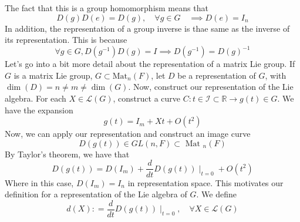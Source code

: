 \documentclass[11pt, oneside]{article}   	%
\theoremstyle{slanted}
\begin{document}
The fact that this is a 
group homomorphism means that 
\[
	D ( g ) D ( e) =  D( g), \quad \forall g \in G  \quad \implies D ( e ) = I_ n 
\] In addition, 
the representation of a group inverse is thae 
same as the inverse of its representation. This is because 
\[
	\forall g \in G, D ( g ^{ -1  } ) D ( g) = I \implies D ( g ^{ -1  } )  = D ( g) ^{ -1 }
\]  
Let's go into a bit more detail about the representation
of a matrix Lie group. If $ G $ is a matrix Lie group, 
$ G \subset \text{Mat} _n ( F )  $, let $ D $ 
be a representation of $ G$, with  $ \dim ( D ) = n \neq m \neq \dim ( G ) $. 
Now, construct our representation of 
the Lie algebra. 
For each  $ X \in \mathcal{ L } ( G ) $, 
construct a curve $ C : t \in \mathcal{ I } \subset \mathbb{ R} \to g ( t) \in G $. 
We have the expansion 
\[
 g ( t) = I_m + Xt + O ( t ^ 2 ) 
\] Now, we can apply our
representation and construct an image curve
\[
	D ( g ( t ) ) \in GL( n, F ) \subset \text{ Mat }_n ( F) 
\] By Taylor's theorem, 
we have that 
\[
	D ( g ( t ) ) = D ( I _ m ) + \frac{d }{ dt } D ( g ( t) ) \mid_{ t = 0 } + O ( t^ 2 ) 
\] Where in this case, $ D ( I _ m )  = I _ n $ in
representation space. This motivates our definition 
for a representation of the Lie algebra of  $ G $.
We define 
\[
	d ( X) : = \frac{d }{ dt  }  D( g ( t ) ) \mid_{ t =0 }, \quad \forall X \in \mathcal{ L } ( G ) 
\] 
\end{document}

